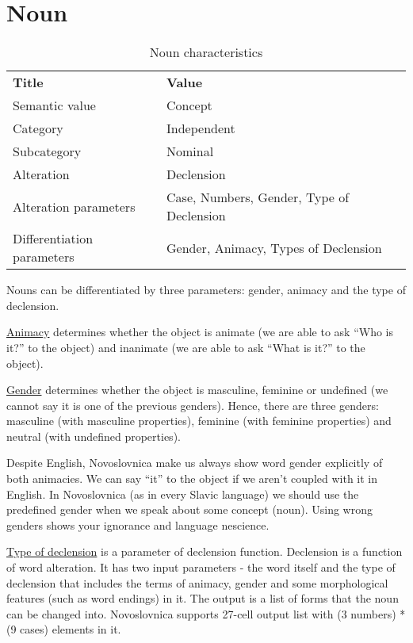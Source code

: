\section{Noun}

\begin{table}[h]
	\caption{Noun characteristics}
	\begin{tabular}{lp{12em}}
		\textbf{Title}              & \textbf{Value}                            \\
		Semantic value              & Concept                                   \\
		Category                    & Independent                               \\
		Subcategory                 & Nominal                                   \\
		Alteration                  & Declension                                \\
		Alteration parameters       & Case, Numbers, Gender, Type of Declension \\
		Differentiation parameters  & Gender, Animacy, Types of  Declension                                  
	\end{tabular}
\end{table}

Nouns can be differentiated by three parameters: gender, animacy and the type of declension.

\underline{Animacy} determines whether the object is animate (we are able to ask “Who is it?” to the object) and inanimate (we are able to ask “What is it?” to the object).

\underline{Gender} determines whether the object is masculine, feminine or undefined (we cannot say it is one of the previous genders). Hence, there are three genders: masculine (with masculine properties), feminine (with feminine properties) and neutral (with undefined properties).

Despite English, Novoslovnica make us always show word gender explicitly of both animacies. We can say “it” to the object if we aren’t coupled with it in English. In Novoslovnica (as in every Slavic language) we should use the predefined gender when we speak about some concept (noun). Using wrong genders shows your ignorance and language nescience.

\underline{Type of declension} is a parameter of declension function. Declension is a function of word alteration. It has two input parameters - the word itself and the type of declension that includes the terms of animacy, gender and some morphological features (such as word endings) in it. The output is a list of forms that the noun can be changed into. Novoslovnica supports 27-cell output list with (3 numbers) * (9 cases) elements in it.


